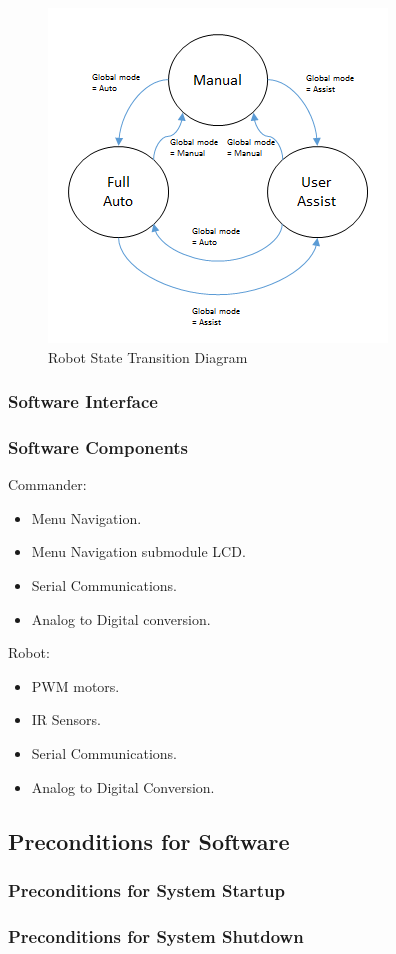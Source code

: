 \documentclass{article}
\begin{document}
	\begin{figure}[h]
		\includegraphics[scale=0.7]{robot_std.png}
		\centering
		\caption{Robot State Transition Diagram}
	\end{figure}

\subsubsection{Software Interface}

\subsubsection{Software Components}

Commander:
	\begin{itemize}
		\item Menu Navigation.
		\item Menu Navigation submodule LCD.
		\item Serial Communications. 
		\item Analog to Digital conversion.
	\end{itemize}
	
Robot:
	\begin{itemize}
		\item PWM motors.
		\item IR Sensors.
		\item Serial Communications.
		\item Analog to Digital Conversion.
	\end{itemize}

\subsection{Preconditions for Software}
\subsubsection{Preconditions for System Startup}
\subsubsection{Preconditions for System Shutdown}
\end{document}
